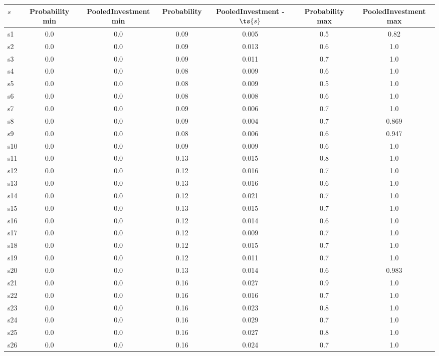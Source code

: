 \documentclass{article}
\begin{document}
\noindent\begin{tabular}{|l|c|c|c|c|c|c|}
\hline
$s$& Probability min & PooledInvestment min & Probability & PooledInvestment - $\ts{s}$ & Probability max & PooledInvestment max\\
\hline
s1 &0.0 & 0.0 & 0.09 & 0.005 & 0.5 & 0.82\\
\hline
s2 &0.0 & 0.0 & 0.09 & 0.013 & 0.6 & 1.0\\
\hline
s3 &0.0 & 0.0 & 0.09 & 0.011 & 0.7 & 1.0\\
\hline
s4 &0.0 & 0.0 & 0.08 & 0.009 & 0.6 & 1.0\\
\hline
s5 &0.0 & 0.0 & 0.08 & 0.009 & 0.5 & 1.0\\
\hline
s6 &0.0 & 0.0 & 0.08 & 0.008 & 0.6 & 1.0\\
\hline
s7 &0.0 & 0.0 & 0.09 & 0.006 & 0.7 & 1.0\\
\hline
s8 &0.0 & 0.0 & 0.09 & 0.004 & 0.7 & 0.869\\
\hline
s9 &0.0 & 0.0 & 0.08 & 0.006 & 0.6 & 0.947\\
\hline
s10 &0.0 & 0.0 & 0.09 & 0.009 & 0.6 & 1.0\\
\hline
s11 &0.0 & 0.0 & 0.13 & 0.015 & 0.8 & 1.0\\
\hline
s12 &0.0 & 0.0 & 0.12 & 0.016 & 0.7 & 1.0\\
\hline
s13 &0.0 & 0.0 & 0.13 & 0.016 & 0.6 & 1.0\\
\hline
s14 &0.0 & 0.0 & 0.12 & 0.021 & 0.7 & 1.0\\
\hline
s15 &0.0 & 0.0 & 0.13 & 0.015 & 0.7 & 1.0\\
\hline
s16 &0.0 & 0.0 & 0.12 & 0.014 & 0.6 & 1.0\\
\hline
s17 &0.0 & 0.0 & 0.12 & 0.009 & 0.7 & 1.0\\
\hline
s18 &0.0 & 0.0 & 0.12 & 0.015 & 0.7 & 1.0\\
\hline
s19 &0.0 & 0.0 & 0.12 & 0.011 & 0.7 & 1.0\\
\hline
s20 &0.0 & 0.0 & 0.13 & 0.014 & 0.6 & 0.983\\
\hline
s21 &0.0 & 0.0 & 0.16 & 0.027 & 0.9 & 1.0\\
\hline
s22 &0.0 & 0.0 & 0.16 & 0.016 & 0.7 & 1.0\\
\hline
s23 &0.0 & 0.0 & 0.16 & 0.023 & 0.8 & 1.0\\
\hline
s24 &0.0 & 0.0 & 0.16 & 0.029 & 0.7 & 1.0\\
\hline
s25 &0.0 & 0.0 & 0.16 & 0.027 & 0.8 & 1.0\\
\hline
s26 &0.0 & 0.0 & 0.16 & 0.024 & 0.7 & 1.0\\

\end{tabular}
\end{document}
